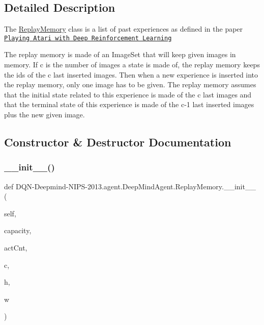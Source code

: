 \subsection{Detailed Description}
The \hyperlink{classDQN-Deepmind-NIPS-2013_1_1agent_1_1DeepMindAgent_1_1ReplayMemory}{Replay\+Memory} class is a list of past experiences as defined in the paper \href{https://www.cs.toronto.edu/~vmnih/docs/dqn.pdf}{\tt Playing Atari with Deep Reinforcement Learning} 

The replay memory is made of an Image\+Set that will keep given images in memory. If \textquotesingle{}c\textquotesingle{} is the number of images a state is made of, the replay memory keeps the ids of the \textquotesingle{}c\textquotesingle{} last inserted images. Then when a new experience is inserted into the replay memory, only one image has to be given. The replay memory assumes that the initial state related to this experience is made of the \textquotesingle{}c\textquotesingle{} last images and that the terminal state of this experience is made of the \textquotesingle{}c-\/1\textquotesingle{} last inserted images plus the new given image. 

\subsection{Constructor \& Destructor Documentation}
\hypertarget{classDQN-Deepmind-NIPS-2013_1_1agent_1_1DeepMindAgent_1_1ReplayMemory_a8b43f49e7cc41952febfe6bdf7003a83}{}\label{classDQN-Deepmind-NIPS-2013_1_1agent_1_1DeepMindAgent_1_1ReplayMemory_a8b43f49e7cc41952febfe6bdf7003a83} 
\subsubsection{\texorpdfstring{\+\_\+\+\_\+init\+\_\+\+\_\+()}{\_\_init\_\_()}}
{\footnotesize\ttfamily def D\+QN-\/Deepmind-\/N\+I\+PS-\/2013.agent.\+Deep\+Mind\+Agent.\+Replay\+Memory.\+\_\+\+\_\+init\+\_\+\+\_\+ (\begin{DoxyParamCaption}\item[{}]{self,  }\item[{}]{capacity,  }\item[{}]{act\+Cnt,  }\item[{}]{c,  }\item[{}]{h,  }\item[{}]{w }\end{DoxyParamCaption})}



